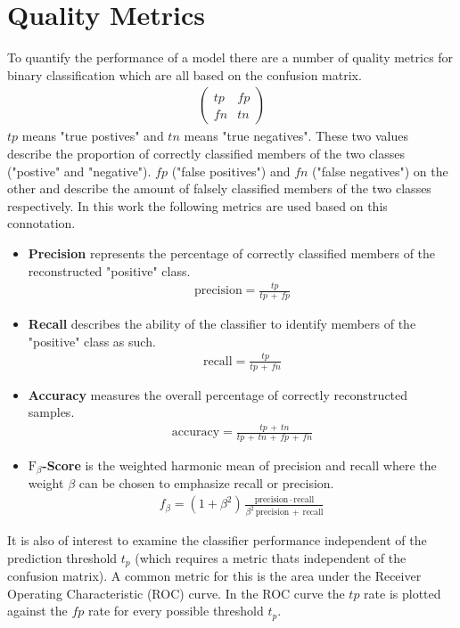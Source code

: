 \section{Quality Metrics}
\label{sec:quality_metrics}
To quantify the performance of a model there are a number of quality metrics for binary classification which are all based on the confusion matrix.
\begin{align}
    \begin{pmatrix}
        tp & fp \\
        fn & tn
    \end{pmatrix}
\end{align}
$tp$ means "true postives" and $tn$ means "true negatives". 
These two values describe the proportion of correctly classified members of the two classes ("postive" and "negative").
$fp$ ("false positives") and $fn$ ("false negatives") on the other and describe the amount of falsely classified members of the two classes respectively.
In this work the following metrics are used based on this connotation.
\begin{itemize}
    \item \textbf{Precision} represents the percentage of correctly classified members of the reconstructed "positive" class.
        \begin{align}
            \text{precision} = \frac{tp}{tp\, +\, fp}
        \end{align}
    \item \textbf{Recall} describes the ability of the classifier to identify members of the "positive" class as such.
        \begin{align}
            \text{recall} = \frac{tp}{tp\, +\, fn}
        \end{align}
    \item \textbf{Accuracy} measures the overall percentage of correctly reconstructed samples.
        \begin{align}
            \text{accuracy} = \frac{tp\, +\, tn}{tp\, +\, tn\, +\, fp\, +\, fn}
        \end{align}
    \item \textbf{$\text{F}_\beta$-Score} is the weighted harmonic mean of precision and recall where the weight $\beta$ can be chosen to emphasize recall or precision.
        \begin{align}
            f_\beta = (1 + \beta^2) \frac{\text{precision}\, \cdot\, \text{recall}}{\beta^2\, \text{precision}\, +\, \text{recall}}
        \end{align}
\end{itemize}
It is also of interest to examine the classifier performance independent of the prediction threshold $t_p$ 
(which requires a metric thats independent of the confusion matrix).
A common metric for this is the area under the Receiver Operating Characteristic (ROC) curve.
In the ROC curve the $tp$ rate is plotted against the $fp$ rate for every possible threshold $t_p$.

